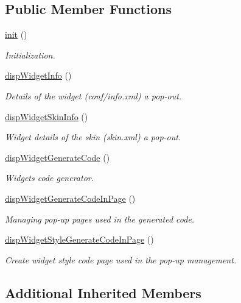 \subsection*{Public Member Functions}
\begin{DoxyCompactItemize}
\item 
\hyperlink{classwidgetView_aae33eb1e6769bef674ec184703a6bac2}{init} ()
\begin{DoxyCompactList}\small\item\em Initialization. \end{DoxyCompactList}\item 
\hyperlink{classwidgetView_aa0744579c05eacb742561abbc967c720}{disp\+Widget\+Info} ()
\begin{DoxyCompactList}\small\item\em Details of the widget (conf/info.\+xml) a pop-\/out. \end{DoxyCompactList}\item 
\hyperlink{classwidgetView_a7d7203cb8a9ddec4628beb6ae1f55ff5}{disp\+Widget\+Skin\+Info} ()
\begin{DoxyCompactList}\small\item\em Widget details of the skin (skin.\+xml) a pop-\/out. \end{DoxyCompactList}\item 
\hyperlink{classwidgetView_af0e573b3b57857bc0941237399e21b19}{disp\+Widget\+Generate\+Code} ()
\begin{DoxyCompactList}\small\item\em Widget\textquotesingle{}s code generator. \end{DoxyCompactList}\item 
\hyperlink{classwidgetView_a0600670ca5dac17d9549bacecd90c3cf}{disp\+Widget\+Generate\+Code\+In\+Page} ()
\begin{DoxyCompactList}\small\item\em Managing pop-\/up pages used in the generated code. \end{DoxyCompactList}\item 
\hyperlink{classwidgetView_a0bc95329be4497bd1b8dbb7702b51e2c}{disp\+Widget\+Style\+Generate\+Code\+In\+Page} ()
\begin{DoxyCompactList}\small\item\em Create widget style code page used in the pop-\/up management. \end{DoxyCompactList}\end{DoxyCompactItemize}
\subsection*{Additional Inherited Members}



